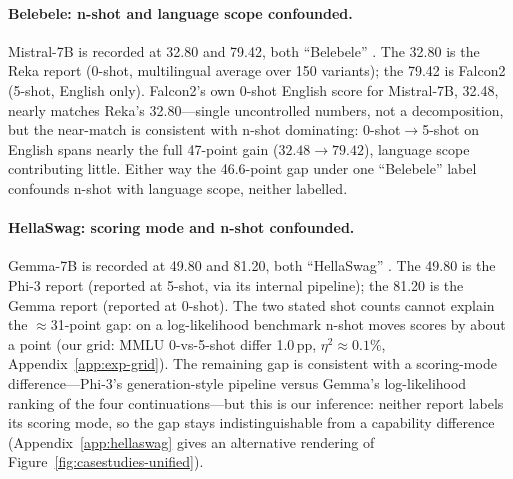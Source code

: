 \documentclass[11pt]{article}
\begin{document}
\paragraph{Belebele: n-shot and language scope confounded.}\label{sec:belebele}
Mistral-7B is recorded at 32.80 and 79.42, both ``Belebele''
\citep{bandarkar2023belebele}. The 32.80 is the Reka report
\citep{team2024reka} (0-shot, multilingual average over 150 variants); the 79.42
is Falcon2 \citep{malartic2024falcon2} (5-shot, English only). Falcon2's own
0-shot English score for Mistral-7B, 32.48, nearly matches Reka's 32.80---single
uncontrolled numbers, not a decomposition, but the near-match is
consistent with n-shot dominating: 0-shot$\to$5-shot on English spans nearly the
full 47-point gain ($32.48 \to 79.42$), language scope contributing little. Either
way the 46.6-point gap under one ``Belebele'' label confounds n-shot with language
scope, neither labelled.

\paragraph{HellaSwag: scoring mode and n-shot confounded.}\label{sec:hellaswag}
Gemma-7B is recorded at 49.80 and 81.20, both ``HellaSwag''
\citep{zellers2019hellaswag}. The 49.80 is the Phi-3 report
\citep{abdin2024phi3} (reported at 5-shot, via its internal pipeline); the 81.20 is
the Gemma report \citep{gemmateam2024gemma} (reported at 0-shot). The two stated
shot counts cannot explain the $\approx$31-point gap: on a log-likelihood benchmark
n-shot moves scores by about a point (our grid: MMLU 0-vs-5-shot differ 1.0\,pp,
$\eta^2\approx0.1\%$, Appendix~\ref{app:exp-grid}). The remaining gap is consistent
with a scoring-mode difference---Phi-3's generation-style pipeline versus Gemma's
log-likelihood ranking of the four continuations---but this is our inference:
neither report labels its scoring mode, so the gap stays indistinguishable from a
capability difference (Appendix~\ref{app:hellaswag} gives an alternative rendering
of Figure~\ref{fig:casestudies-unified}).
\end{document}
